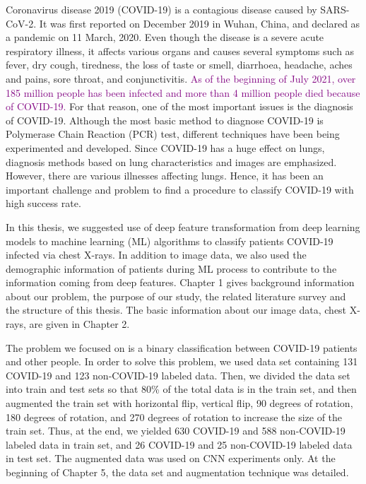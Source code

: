 Coronavirus disease 2019 (COVID-19) is a contagious disease caused by SARS-CoV-2. It was first reported on December 2019 in Wuhan, China, and declared as a pandemic on 11 March, 2020. Even though the disease is a severe acute respiratory illness, it affects various organs and causes several symptoms such as fever, dry cough, tiredness, the loss of taste or smell, diarrhoea, headache, aches and pains, sore throat, and conjunctivitis. \textcolor{purple}{As of the beginning of July 2021, over 185 million people has been infected and more than 4 million people died because of COVID-19.} For that reason, one of the most important issues is the diagnosis of COVID-19. Although the most basic method to diagnose COVID-19 is Polymerase Chain Reaction (PCR) test, different techniques have been being experimented and developed. Since COVID-19 has a huge effect on lungs, diagnosis methods based on lung characteristics and images are emphasized. However, there are various illnesses affecting lungs. Hence, it has been an important challenge and problem to find a procedure to classify COVID-19 with high success rate.

In this thesis, we suggested use of deep feature transformation from deep learning models to machine learning (ML) algorithms to classify patients COVID-19 infected via chest X-rays. In addition to image data, we also used the demographic information of patients during ML process to contribute to the information coming from deep features. Chapter 1 gives background information about our problem, the purpose of our study, the related literature survey and the structure of this thesis. The basic information about our image data, chest X-rays, are given in Chapter 2.

The problem we focused on is a binary classification between COVID-19 patients and other people. In order to solve this problem, we used data set containing 131 COVID-19 and 123 non-COVID-19 labeled data. Then, we divided the data set into train and test sets so that 80\% of the total data is in the train set, and then augmented the train set with horizontal flip, vertical flip, 90 degrees of rotation, 180 degrees of rotation, and 270 degrees of rotation to increase the size of the train set. Thus, at the end, we yielded 630 COVID-19 and 588 non-COVID-19 labeled data in train set, and 26 COVID-19 and 25 non-COVID-19 labeled data in test set. The augmented data was used on CNN experiments only. At the beginning of Chapter 5, the data set and augmentation technique was detailed.

